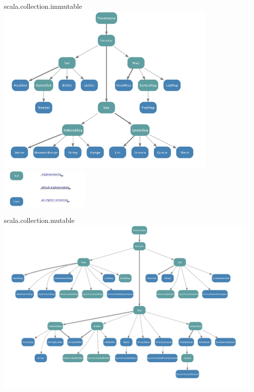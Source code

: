 \begin{Slide}{scala.collection.immutable}
\includegraphics[width=0.82\textwidth]{../img/collection/collection-immutable}
\includegraphics[width=0.33\textwidth]{../img/collection/collection-legend}
\end{Slide}


\begin{Slide}{scala.collection.mutable}
\includegraphics[width=1.05\textwidth]{../img/collection/collection-mutable}
\end{Slide}



